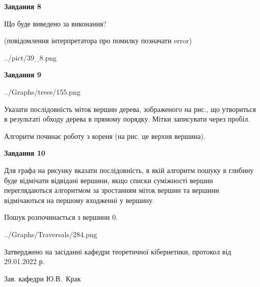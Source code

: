 \documentclass[12pt, ukrainian]{article}
\begin{document}
{\begin {large}
{\begin {center}\textbf{Завдання 8}\end {center}}\par
Що буде виведено за виконання?\par
 (повідомлення інтерпретатора про помилку позначати error)\par
\begin{center}
	{../pict/39_8.png}
\end{center}
\newpage

{\begin {center}\textbf{Завдання 9}\end {center}}\par

\begin{center}
	{../Graphs/trees/155.png}
\end{center}
Указати послідовність міток вершин дерева, зображеного на рис., що утвориться в результаті обходу дерева в прямому порядку. Мітки записувати через пробіл.\par Алгоритм починає роботу з кореня (на рис. це верхня вершина).\par
\newpage

{\begin {center}\textbf{Завдання 10}\end {center}}\par
Для графа на рисунку вказати послідовність, в якій алгоритм пошуку в глибину буде відмічати відвідані вершини, якщо списки суміжності вершин переглядаються алгоритмом за зростанням міток вершин та вершини відмічаються на першому вход\-женні у вершину.\par
Пошук розпочинається з вершини 0.\par

\begin{center}
	{../Graphs/Traversals/284.png}
\end{center}\par
\newpage


\end {large}
}
{\smallskip \begin {small} Затверджено на засіданні кафедри теоретичної кібернетики, протокол  від   29.01.2022 р.\par\smallskip\smallskip
{\parbox {6.5 cm}{Зав. кафедри \dotfill Ю.В.~Крак}} \end{small}}
\end{document}
